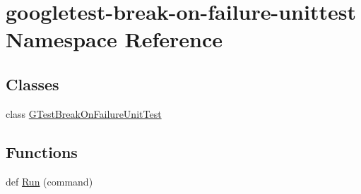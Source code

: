 \hypertarget{namespacegoogletest-break-on-failure-unittest}{}\section{googletest-\/break-\/on-\/failure-\/unittest Namespace Reference}
\label{namespacegoogletest-break-on-failure-unittest}
\subsection*{Classes}
\begin{DoxyCompactItemize}
\item 
class \mbox{\hyperlink{classgoogletest-break-on-failure-unittest_1_1GTestBreakOnFailureUnitTest}{G\+Test\+Break\+On\+Failure\+Unit\+Test}}
\end{DoxyCompactItemize}
\subsection*{Functions}
\begin{DoxyCompactItemize}
\item 
def \mbox{\hyperlink{namespacegoogletest-break-on-failure-unittest_a1af5bbcd251e90355ddcd17d0e0e6147}{Run}} (command)
\end{DoxyCompactItemize}
